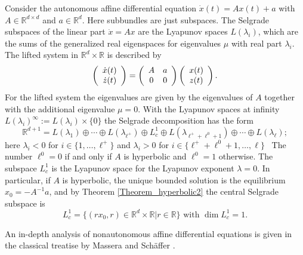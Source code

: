 	\begin{example}
		\label{Example6.1}Consider the autonomous affine differential equation
		$\dot{x}(t)=Ax(t)+a$ with $A\in\mathbb{R}^{d\times d}$ and $a\in\mathbb{R}%
		^{d}$. Here subbundles are just subspaces. The Selgrade subspaces of the
		linear part $\dot{x}=Ax$ are the Lyapunov spaces $L(\lambda_{i})$, which are
		the sums of the generalized real eigenspaces for eigenvalues $\mu$ with real
		part $\lambda_{i}$. The lifted system in $\mathbb{R}^{d}\times\mathbb{R}$ is
		described by
		\begin{equation}
			\left(
			\begin{array}
				[c]{c}%
				\dot{x}(t)\\
				\dot{z}(t)
			\end{array}
			\right)  =\left(
			\begin{array}
				[c]{cc}%
				A & a\\
				0 & 0
			\end{array}
			\right)  \left(
			\begin{array}
				[c]{c}%
				x(t)\\
				z(t)
			\end{array}
			\right)  . \label{aut_lift}%
		\end{equation}
		For the lifted system the eigenvalues are given by the eigenvalues of $A$
		together with the additional eigenvalue $\mu=0$. With the Lyapunov spaces at
		infinity $L(\lambda_{i})^{\infty}:=L(\lambda_{i})\times\{0\}$ the Selgrade
		decomposition has the form
		\[
		\mathbb{R}^{d+1}=L(\lambda_{1})\oplus\cdots\oplus L(\lambda_{\ell^{+}})\oplus
		L_{c}^{1}\oplus L(\lambda_{\ell^{+}+\ell^{0}+1})\oplus\cdots\oplus
		L(\lambda_{\ell});
		\]
		here $\lambda_{i}<0$ for $i\in\{1,\ldots,\ell^{+}\}$ and $\lambda_{i}>0$ for
		$i\in\{\ell^{+}+\ell^{0}+1,\ldots,\ell\}$ \ The number $\ell^{0}=0$ if and
		only if $A$ is hyperbolic and $\ell^{0}=1$ otherwise. The subspace $L_{c}^{1}$
		is the Lyapunov space for the Lyapunov exponent $\lambda=0$. In particular, if
		$A$ is hyperbolic, the unique bounded solution is the equilibrium
		$x_{0}=-A^{-1}a$, and by Theorem \ref{Theorem_hyperbolic2} the central
		Selgrade subspace is
		\[
		L_{c}^{1}=\{(rx_{0},r)\in\mathbb{R}^{d}\times\mathbb{R}\left\vert
		r\in\mathbb{R}\right.  \}\mbox{ with }\dim L_{c}^{1}=1.
		\]
		
	\end{example}
	
	\begin{remark}
		An in-depth analysis of nonautonomous affine differential equations is given
		in the classical treatise by Massera and Sch\"{a}ffer \cite{MasSch}.
	\end{remark}
	
